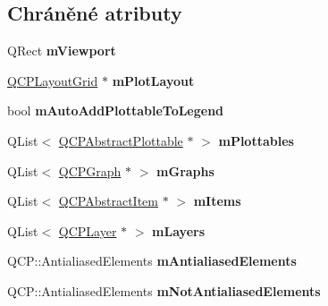 \subsection*{Chráněné atributy}
\begin{DoxyCompactItemize}
\item 
\hypertarget{classQCustomPlot_ac0a7c38a715526c257cff95774f83ab6}{}Q\+Rect {\bfseries m\+Viewport}\label{classQCustomPlot_ac0a7c38a715526c257cff95774f83ab6}

\item 
\hypertarget{classQCustomPlot_ac97298756882a0eecd98151679850ac1}{}\hyperlink{classQCPLayoutGrid}{Q\+C\+P\+Layout\+Grid} $\ast$ {\bfseries m\+Plot\+Layout}\label{classQCustomPlot_ac97298756882a0eecd98151679850ac1}

\item 
\hypertarget{classQCustomPlot_aaf3ea6a4cb04d35a149cc9a0cdac3394}{}bool {\bfseries m\+Auto\+Add\+Plottable\+To\+Legend}\label{classQCustomPlot_aaf3ea6a4cb04d35a149cc9a0cdac3394}

\item 
\hypertarget{classQCustomPlot_a62bf8e4e7f8d23fc1e9301ba0148269f}{}Q\+List$<$ \hyperlink{classQCPAbstractPlottable}{Q\+C\+P\+Abstract\+Plottable} $\ast$ $>$ {\bfseries m\+Plottables}\label{classQCustomPlot_a62bf8e4e7f8d23fc1e9301ba0148269f}

\item 
\hypertarget{classQCustomPlot_adaf8d407d72a725169d7dbed2ee386bb}{}Q\+List$<$ \hyperlink{classQCPGraph}{Q\+C\+P\+Graph} $\ast$ $>$ {\bfseries m\+Graphs}\label{classQCustomPlot_adaf8d407d72a725169d7dbed2ee386bb}

\item 
\hypertarget{classQCustomPlot_a6a93905372326e31e98d6c3bc8953ec8}{}Q\+List$<$ \hyperlink{classQCPAbstractItem}{Q\+C\+P\+Abstract\+Item} $\ast$ $>$ {\bfseries m\+Items}\label{classQCustomPlot_a6a93905372326e31e98d6c3bc8953ec8}

\item 
\hypertarget{classQCustomPlot_a72ee313041b873d76c198793ce7e6c37}{}Q\+List$<$ \hyperlink{classQCPLayer}{Q\+C\+P\+Layer} $\ast$ $>$ {\bfseries m\+Layers}\label{classQCustomPlot_a72ee313041b873d76c198793ce7e6c37}

\item 
\hypertarget{classQCustomPlot_aa333200629256830e273873b582a5524}{}Q\+C\+P\+::\+Antialiased\+Elements {\bfseries m\+Antialiased\+Elements}\label{classQCustomPlot_aa333200629256830e273873b582a5524}

\item 
\hypertarget{classQCustomPlot_a2b6ebcad00a90ba07f146cefcd4293da}{}Q\+C\+P\+::\+Antialiased\+Elements {\bfseries m\+Not\+Antialiased\+Elements}\label{classQCustomPlot_a2b6ebcad00a90ba07f146cefcd4293da}


\end{DoxyCompactItemize}
